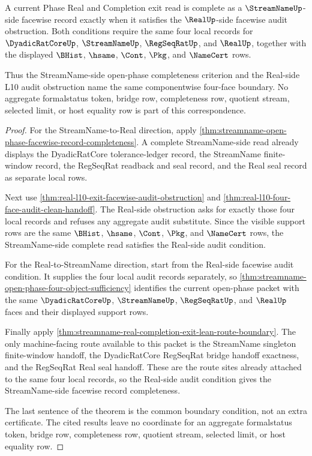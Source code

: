 \begin{theorem}
\label{thm:streamname-real-open-phase-facewise-audit-correspondence}
A current Phase Real and Completion exit read is complete as a $\StreamNameUp$-side facewise record exactly when it satisfies the $\RealUp$-side facewise audit obstruction. Both conditions require the same four local records for $\DyadicRatCoreUp$, $\StreamNameUp$, $\RegSeqRatUp$, and $\RealUp$, together with the displayed $\BHist$, $\hsame$, $\Cont$, $\Pkg$, and $\NameCert$ rows.

Thus the StreamName-side open-phase completeness criterion and the Real-side L10 audit obstruction name the same componentwise four-face boundary. No aggregate formalstatus token, bridge row, completeness row, quotient stream, selected limit, or host equality row is part of this correspondence.
\end{theorem}
\begin{proof}
For the StreamName-to-Real direction, apply \autoref{thm:streamname-open-phase-facewise-record-completeness}. A complete StreamName-side read already displays the DyadicRatCore tolerance-ledger record, the StreamName finite-window record, the RegSeqRat readback and seal record, and the Real seal record as separate local rows.

Next use \autoref{thm:real-l10-exit-facewise-audit-obstruction} and \autoref{thm:real-l10-four-face-audit-clean-handoff}. The Real-side obstruction asks for exactly those four local records and refuses any aggregate audit substitute. Since the visible support rows are the same $\BHist$, $\hsame$, $\Cont$, $\Pkg$, and $\NameCert$ rows, the StreamName-side complete read satisfies the Real-side audit condition.

For the Real-to-StreamName direction, start from the Real-side facewise audit condition. It supplies the four local audit records separately, so \autoref{thm:streamname-open-phase-four-object-sufficiency} identifies the current open-phase packet with the same $\DyadicRatCoreUp$, $\StreamNameUp$, $\RegSeqRatUp$, and $\RealUp$ faces and their displayed support rows.

Finally apply \autoref{thm:streamname-real-completion-exit-lean-route-boundary}. The only machine-facing route available to this packet is the StreamName singleton finite-window handoff, the DyadicRatCore RegSeqRat bridge handoff exactness, and the RegSeqRat Real seal handoff. These are the route sites already attached to the same four local records, so the Real-side audit condition gives the StreamName-side facewise record completeness.

The last sentence of the theorem is the common boundary condition, not an extra certificate. The cited results leave no coordinate for an aggregate formalstatus token, bridge row, completeness row, quotient stream, selected limit, or host equality row.
\end{proof}

